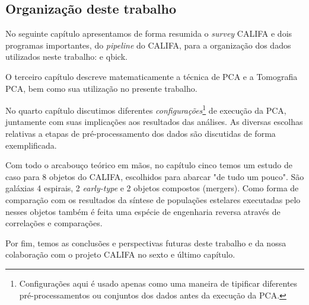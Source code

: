 \subsection{Organização deste trabalho}

No seguinte capítulo apresentamos de forma resumida o {\em survey} CALIFA e dois programas importantes, do {\em
pipeline} do CALIFA, para a organização dos dados utilizados neste trabalho: \pycasso e {\sc qbick}.

O terceiro capítulo descreve matematicamente a técnica de PCA e a Tomografia PCA, bem como sua utilização no presente trabalho. 

No quarto capítulo discutimos diferentes {\em configurações}\footnote{Configurações aqui é usado apenas como uma maneira
de tipificar diferentes pré-processamentos ou conjuntos dos dados antes da execução da PCA.} de execução da PCA,
juntamente com suas implicações aos resultados das análises. As diversas escolhas relativas a etapas de
pré-processamento dos dados são discutidas de forma exemplificada.

Com todo o arcabouço teórico em mãos, no capítulo cinco temos um estudo de caso para 8 objetos do CALIFA, escolhidos
para abarcar "de tudo um pouco". São galáxias 4 espirais, 2 {\em early-type} e 2 objetos compostos (mergers). Como
forma de comparação com os resultados da síntese de populações estelares executadas pelo \starlight nesses objetos
também é feita uma espécie de engenharia reversa através de correlações e comparações.

Por fim, temos as conclusões e perspectivas futuras deste trabalho e da nossa colaboração com o projeto CALIFA no sexto
e último capítulo. 


